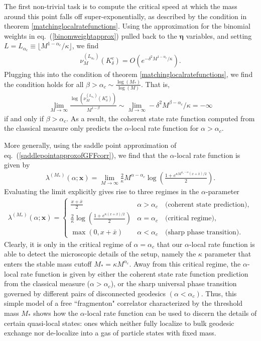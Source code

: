 \documentclass[a4paper,11pt]{article}
\theoremstyle{plain}
\theoremstyle{definition}
\theoremstyle{remark}
\newcommand{\bs}[1]{\boldsymbol{#1}}
\newcommand{\ba}{\begin{equation} \begin{aligned}}
\newcommand{\ea}{\end{aligned} \end{equation}}
\begin{document}
The first non-trivial task is to compute the critical speed at which the mass around this point falls off super-exponentially, as described by the condition in theorem \ref{matchinglocalratefunctions}. Using the approximation for the binomial weights in eq.~(\ref{binomweightapprox}) pulled back to the $\bs{\eta}$ variables, and setting $L=L_{\alpha_c} \equiv \lfloor M^{1-\alpha_c}/\kappa \rfloor$, we find
\ba
\nu_{M}^{(L_{\alpha_c})}(K^c_\delta) =O( e^{-\delta^2 M^{1-\alpha_c} /\kappa}).
\ea
Plugging this into the condition of theorem \ref{matchinglocalratefunctions}, we find the condition holds for all $\beta > \alpha_c \sim \frac{\log(M_*)}{\log(M)}$. That is,
\ba
\lim_{M\to\infty} \frac{\log(\nu_{M}^{(L_{\alpha_c})}(K^c_\delta))}{M^{1-\beta}} \sim \lim_{M\to\infty} -\delta^2 M^{\beta - \alpha_c}/\kappa = -\infty
\ea
if and only if $\beta > \alpha_c$. As a result, the coherent state rate function computed from the classical measure only predicts the $\alpha$-local rate function for $\alpha > \alpha_c $. 

More generally, using the saddle point approximation of eq.~(\ref{saddlepointapproxofGFFcorr}), we find that the $\alpha$-local rate function is given by
\ba
\lambda^{(M_*)}(\alpha;\bs{x}) = \lim_{M \to \infty} \frac{2}{\kappa} M^{\alpha-\alpha_c} \log\left( \frac{1 + e^{\kappa M^{\alpha_c - \alpha} (x+\bar{x})/2 }}{2} \right).
\ea
Evaluating the limit explicitly gives rise to three regimes in the $\alpha$-parameter
\ba
\lambda^{(M_*)}(\alpha;\bs{x})  =  \begin{cases}
\displaystyle \frac{x+\bar{x}}{2} & \alpha > \alpha_c \quad \text{(coherent state prediction)}, \\[14pt]
\displaystyle \frac{2}{\kappa}\log \left( \frac{1 + e^{\kappa (x+\bar{x}) / 2}}{2} \right) & \alpha = \alpha_c \quad \text{(critical regime)}, \\[14pt]
\max(0,x+\bar{x}) & \alpha < \alpha_c \quad \text{(sharp phase transition)}.
\end{cases}
\ea
Clearly, it is only in the critical regime of $\alpha = \alpha_c$ that our $\alpha$-local rate function is able to detect the microscopic details of the setup, namely the $\kappa$ parameter that enters the stable mass cutoff $M_* = \kappa M^{\alpha_c}$. Away from this critical regime, the $\alpha$-local rate function is given by either the coherent state rate function prediction from the classical measure ($\alpha > \alpha_c$), or the sharp universal phase transition governed by different pairs of disconnected geodesics $(\alpha < \alpha_c)$. Thus, this simple model of a free ``fragmenton" correlator characterized by the threshold mass $M_*$ shows how the $\alpha$-local rate function can be used to discern the details of certain quasi-local states: ones which neither fully localize to bulk geodesic exchange nor de-localize into a gas of particle states with fixed mass. 
\end{document}
